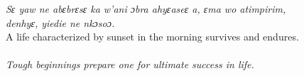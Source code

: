 \begin{refsection}
\noindent\textit{Sɛ yaw ne abɛbrɛsɛ ka w’ani ɔbra ahyɛaseɛ a, ɛma wo atimpirim,}\\
\textit{denhyɛ, yiedie ne nkɔsoɔ.}\\
A life characterized by sunset in the morning survives and endures.\\ \\
\hspace*{10mm}\textit{Tough beginnings prepare one for ultimate success in life.}\\

\end{refsection}

